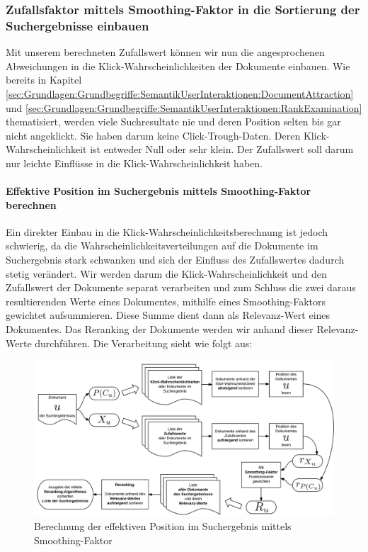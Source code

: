 \subsubsection{Zufallsfaktor mittels Smoothing-Faktor in 	die Sortierung der Suchergebnisse einbauen}
\label{sec:Reranking:Methodik:Vergessen:ZufallsfaktorSmoothing}

Mit unserem berechneten Zufallswert können wir nun die angesprochenen Abweichungen in die Klick-Wahrscheinlichkeiten der Dokumente einbauen. Wie bereits in Kapitel \ref{sec:Grundlagen:Grundbegriffe:SemantikUserInteraktionen:DocumentAttraction} und \ref{sec:Grundlagen:Grundbegriffe:SemantikUserInteraktionen:RankExamination} thematisiert, werden viele Suchresultate nie und deren Position selten bis gar nicht angeklickt. Sie haben darum keine Click-Trough-Daten. Deren Klick-Wahrscheinlichkeit ist entweder Null oder sehr klein. Der Zufallswert soll darum nur leichte Einflüsse in die Klick-Wahrscheinlichkeit haben.

\paragraph{Effektive Position im Suchergebnis mittels Smoothing-Faktor berechnen} 
Ein direkter Einbau in die Klick-Wahrscheinlichkeitsberechnung ist jedoch schwierig, da die Wahrscheinlichkeitsverteilungen auf die Dokumente im Suchergebnis stark schwanken und sich der Einfluss des Zufallswertes dadurch stetig verändert. Wir werden darum die Klick-Wahrscheinlichkeit und den Zufallswert der Dokumente separat verarbeiten und zum Schluss die zwei daraus resultierenden Werte eines Dokumentes, mithilfe eines Smoothing-Faktors gewichtet aufsummieren. Diese Summe dient dann als Relevanz-Wert eines Dokumentes. Das Reranking der Dokumente werden wir anhand dieser Relevanz-Werte durchführen. Die Verarbeitung sieht wie folgt aus:

\begin{figure}[H]
\centering
\vspace{-1em}
\caption[Berechnung der effektiven Position im Suchergebnis mittels Smoothing-Faktor]{Berechnung der effektiven Position im Suchergebnis mittels Smoothing-Faktor}
\label{fig:BerechnungRerankedPosition}
\includegraphics[width=\linewidth]{gfx/BerechnungRerankedPosition}
\vspace{-2.5em}
\end{figure}



